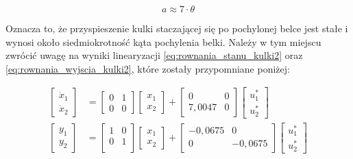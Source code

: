 \begin{equation}
    a \approx 7 \cdot \theta \label{eq:przyspieszenie_kulki3}
\end{equation}

Oznacza to, że przyspieszenie kulki staczającej się po pochylonej belce jest stałe i wynosi około siedmiokrotność kąta pochylenia belki. Należy w tym miejscu zwrócić uwagę na wyniki linearyzacji \eqref{eq:rownania_stanu_kulki2} oraz \eqref{eq:rownania_wyjscia_kulki2}, które zostały przypomniane poniżej:

\begin{align*}
    \begin{bmatrix}
        \dot{x}_1 \\ \dot{x}_2
    \end{bmatrix}
    &= \begin{bmatrix}
        0 & 1 \\
        0 & 0
    \end{bmatrix}
    \begin{bmatrix}
        x_1 \\ x_2
    \end{bmatrix}
    +
    \begin{bmatrix}
        0 & 0 \\ 7,0047 & 0
    \end{bmatrix}
    \begin{bmatrix}
        u_1^* \\ u_2^*
    \end{bmatrix}\\
    \begin{bmatrix}
        y_1 \\ y_2
    \end{bmatrix}
    &= \begin{bmatrix}
        1 & 0 \\
        0 & 1 \\
    \end{bmatrix}
    \begin{bmatrix}
        x_1 \\ x_2
    \end{bmatrix}
    + \begin{bmatrix}
        -0,0675 & 0 \\
        0 & -0,0675
    \end{bmatrix}
    \begin{bmatrix}
        u_1^* \\ u_2^*
    \end{bmatrix}
\end{align*}

